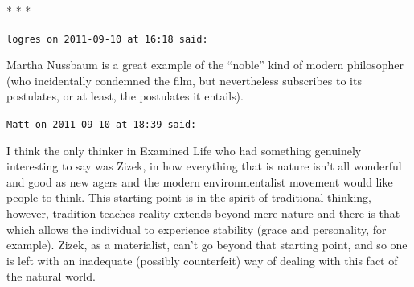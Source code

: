 
\begin{center}* * *\end{center}

\begin{footnotesize}
\begin{sffamily}
\texttt{logres on 2011-09-10 at 16:18 said:}

Martha Nussbaum is a great example of the ``noble'' kind of modern philosopher (who incidentally condemned the film, but nevertheless subscribes to its postulates, or at least, the postulates it entails).

\hfill

\texttt{Matt on 2011-09-10 at 18:39 said:}

I think the only thinker in Examined Life who had something genuinely interesting to say was Zizek, in how everything that is nature isn't all wonderful and good as new agers and the modern environmentalist movement would like people to think. This starting point is in the spirit of traditional thinking, however, tradition teaches reality extends beyond mere nature and there is that which allows the individual to experience stability (grace and personality, for example). Zizek, as a materialist, can't go beyond that starting point, and so one is left with an inadequate (possibly counterfeit) way of dealing with this fact of the natural world.


\hfill

\end{sffamily}
\end{footnotesize}

